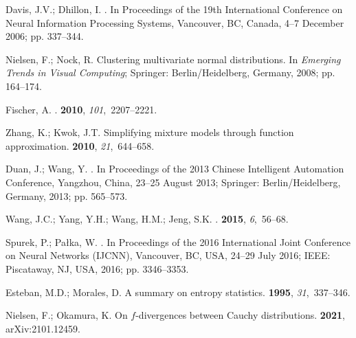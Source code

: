 \documentclass[entropy,article,accept,oneauthor,pdftex,entropy]{Definitions/mdpi}
\begin{document}
\begin{thebibliography}{999}
Davis, J.V.; Dhillon, I.
.
\newblock  In Proceedings of the 19th International Conference on Neural
  Information Processing Systems, {Vancouver, BC, Canada, 4--7 December} 2006; pp. 337--344.

Nielsen, F.; Nock, R.
\newblock Clustering multivariate normal distributions.
\newblock  In \emph{Emerging Trends in Visual Computing}; Springer:  {Berlin/Heidelberg, Germany,}  2008; pp. 164--174.

Fischer, A.
.
 {\bf 2010}, {\em
  101},~2207--2221.

Zhang, K.; Kwok, J.T.
\newblock Simplifying mixture models through function approximation.
 {\bf 2010}, {\em
  21},~644--658.

Duan, J.; Wang, Y.
.
\newblock In Proceedings of the 2013 Chinese Intelligent Automation Conference, {Yangzhou, China, 23--25 August} 2013; 
  Springer:  {Berlin/Heidelberg, Germany},  2013; pp. 565--573.

Wang, J.C.; Yang, Y.H.; Wang, H.M.; Jeng, S.K.
.
 {\bf 2015}, {\em
  6},~56--68.

Spurek, P.; Pa{\l}ka, W.
.
\newblock   In Proceedings of the 2016 International Joint Conference on Neural Networks (IJCNN), {Vancouver, BC, USA, 24--29 July} 2016;   IEEE: {Piscataway, NJ, USA},  2016; pp. 3346--3353.

Esteban, M.D.; Morales, D.
\newblock A summary on entropy statistics.
 {\bf 1995}, {\em 31},~337--346.

Nielsen, F.; Okamura, K.
\newblock On $f$-divergences between Cauchy distributions.
 {\bf 2021}, arXiv:2101.12459.


\end{thebibliography}
\end{document}
